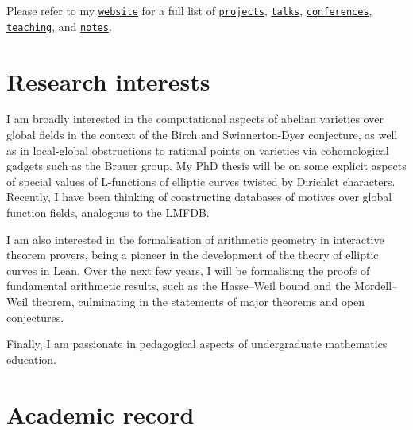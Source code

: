 \documentclass[10pt]{moderncv}
\begin{document}
\makecvtitle

Please refer to my \href{https://multramate.github.io}{\texttt{website}} for a full list of \href{https://multramate.github.io/projects/}{\texttt{projects}}, \href{https://multramate.github.io/talks/}{\texttt{talks}}, \href{https://multramate.github.io/conferences/}{\texttt{conferences}}, \href{https://multramate.github.io/teaching/}{\texttt{teaching}}, and \href{https://multramate.github.io/notes/}{\texttt{notes}}.

\section{Research interests}

I am broadly interested in the computational aspects of abelian varieties over global fields in the context of the Birch and Swinnerton-Dyer conjecture, as well as in local-global obstructions to rational points on varieties via cohomological gadgets such as the Brauer group. My PhD thesis will be on some explicit aspects of special values of L-functions of elliptic curves twisted by Dirichlet characters. Recently, I have been thinking of constructing databases of motives over global function fields, analogous to the LMFDB.

\vspace{0.5cm}

I am also interested in the formalisation of arithmetic geometry in interactive theorem provers, being a pioneer in the development of the theory of elliptic curves in Lean. Over the next few years, I will be formalising the proofs of fundamental arithmetic results, such as the Hasse--Weil bound and the Mordell--Weil theorem, culminating in the statements of major theorems and open conjectures.

\vspace{0.5cm}

Finally, I am passionate in pedagogical aspects of undergraduate mathematics education.

\section{Academic record}

\vspace{-0.1cm}
\vspace{-0.1cm}
\end{document}
